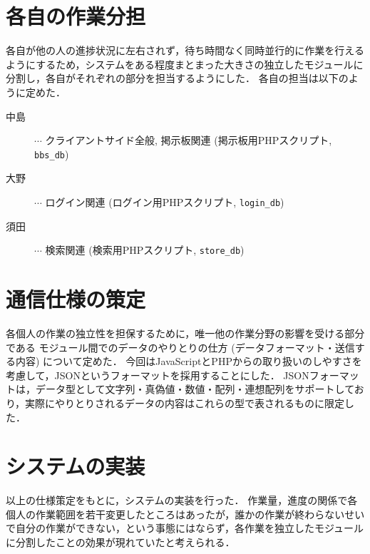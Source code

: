 \documentclass[a4paper]{jsarticle}
\begin{document}
\section{各自の作業分担}
各自が他の人の進捗状況に左右されず，待ち時間なく同時並行的に作業を行えるようにするため，システムをある程度まとまった大きさの独立したモジュールに分割し，各自がそれぞれの部分を担当するようにした．
各自の担当は以下のように定めた．

\begin{description}
\item[中島] $\cdots$ クライアントサイド全般, 掲示板関連 (掲示板用PHPスクリプト, \texttt{bbs\_db})
\item[大野] $\cdots$ ログイン関連 (ログイン用PHPスクリプト, \texttt{login\_db})
\item[須田] $\cdots$ 検索関連 (検索用PHPスクリプト, \texttt{store\_db})
\end{description}

\section{通信仕様の策定}
各個人の作業の独立性を担保するために，唯一他の作業分野の影響を受ける部分である
モジュール間でのデータのやりとりの仕方 (データフォーマット・送信する内容) について定めた．
今回はJavaScriptとPHPからの取り扱いのしやすさを考慮して，JSONというフォーマットを採用することにした．
JSONフォーマットは，データ型として文字列・真偽値・数値・配列・連想配列をサポートしており，実際にやりとりされるデータの内容はこれらの型で表されるものに限定した．

\section{システムの実装}
以上の仕様策定をもとに，システムの実装を行った．
作業量，進度の関係で各個人の作業範囲を若干変更したところはあったが，誰かの作業が終わらないせいで自分の作業ができない，という事態にはならず，各作業を独立したモジュールに分割したことの効果が現れていたと考えられる．
\end{document}
